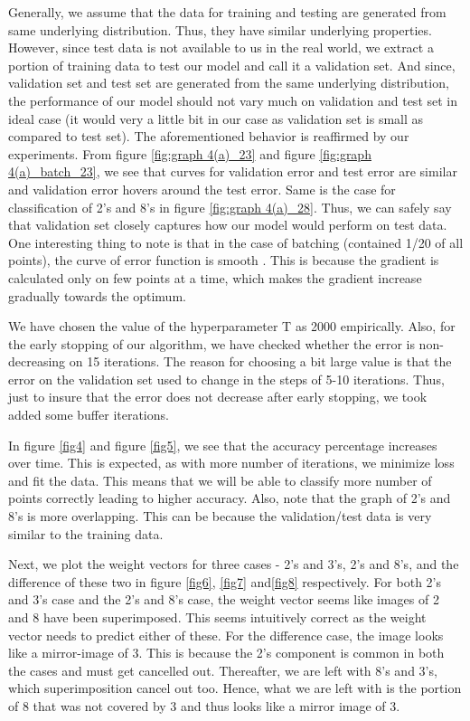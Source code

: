 \documentclass{article}
\begin{document}
Generally, we assume that the data for training and testing are generated from same underlying distribution. Thus, they have similar underlying properties. However, since test data is not available to us in the real world, we extract a portion of training data to test our model and call it a validation set. And since, validation set and test set are generated from the same underlying distribution, the performance of our model should not vary much on validation and test set in ideal case (it would very a little bit in our case as validation set is small as compared to test set). The aforementioned behavior is reaffirmed by our experiments. From figure \ref{fig:graph 4(a)_23} and figure \ref{fig:graph 4(a)_batch_23}, we see that curves for validation error and test error are similar and validation error hovers around the test error. Same is the case for classification of 2's and 8's in figure \ref{fig:graph 4(a)_28}. Thus, we can safely say that validation set closely captures how our model would perform on test data. One interesting thing to note is that in the case of batching (contained 1/20 of all points), the curve of error function is smooth . This is because the gradient is calculated only on few points at a time, which makes the gradient increase gradually towards the optimum. 

We have chosen the value of the hyperparameter T as 2000 empirically. Also, for the early stopping of our algorithm, we have checked whether the error is non-decreasing on 15 iterations. The reason for choosing a bit large value is that the error on the validation set used to change in the steps of 5-10 iterations. Thus, just to insure that the error does not decrease after early stopping, we took added some buffer iterations. 

In figure \ref{fig4} and figure \ref{fig5}, we see that the accuracy percentage increases over time. This is expected, as with more number of iterations, we minimize loss and fit the data. This means that we will be able to classify more number of points correctly leading to higher accuracy. Also, note that the graph of 2's and 8's is more overlapping. This can be because the validation/test data is very similar to the training data.

Next, we plot the weight vectors for three cases - 2's and 3's, 2's and 8's, and the difference of these two in figure \ref{fig6}, \ref{fig7} and\ref{fig8} respectively. For both 2's and 3's case and the 2's and 8's case, the weight vector seems like images of 2 and 8 have been superimposed. This seems intuitively correct as the weight vector needs to predict either of these. For the difference case, the image looks like a mirror-image of 3. This is because the 2's component is common in both the cases and must get cancelled out. Thereafter, we are left with 8's and 3's, which superimposition cancel out too. Hence, what we are left with is the portion of 8 that was not covered by 3 and thus looks like a mirror image of 3.
\end{document}
